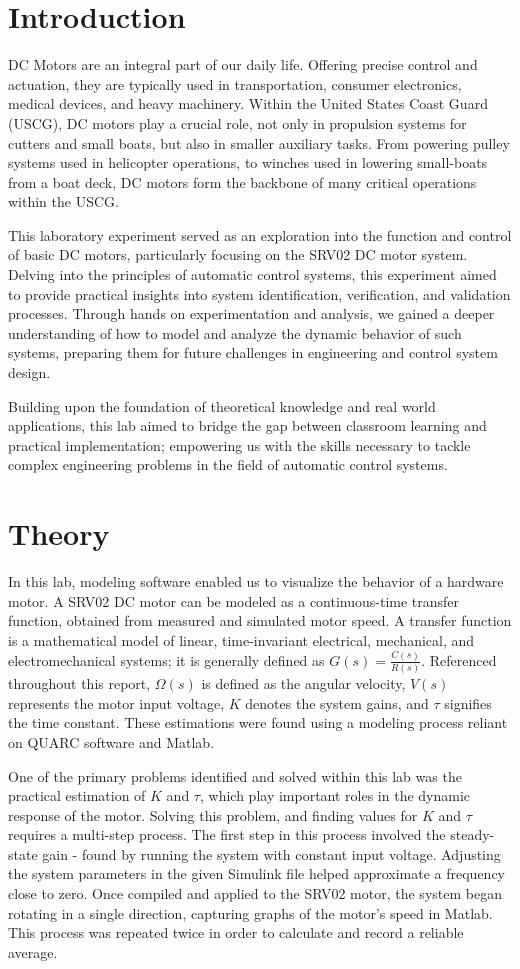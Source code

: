 \documentclass[conference,compsoc]{IEEEtran}
\begin{document}
  \section{Introduction}
  DC Motors are an integral part of our daily life. Offering precise control and actuation, they are typically used in transportation, consumer electronics, medical devices, and heavy machinery. Within the United States Coast Guard (USCG), DC motors play a crucial role, not only in propulsion systems for cutters and small boats, but also in smaller auxiliary tasks. From powering pulley systems used in helicopter operations, to winches used in lowering small-boats from a boat deck, DC motors form the backbone of many critical operations within the USCG.

  This laboratory experiment served as an exploration into the function and control of basic DC motors, particularly focusing on the SRV02 DC motor system. Delving into the principles of automatic control systems, this experiment aimed to provide practical insights into system identification, verification, and validation processes. Through hands on experimentation and analysis, we gained a deeper understanding of how to model and analyze the dynamic behavior of such systems, preparing them for future challenges in engineering and control system design.

  Building upon the foundation of theoretical knowledge and real world applications, this lab aimed to bridge the gap between classroom learning and practical implementation; empowering us with the skills necessary to tackle complex engineering problems in the field of automatic control systems.
  \section{Theory}
  In this lab, modeling software enabled us to visualize the behavior of a hardware motor. A SRV02 DC motor can be modeled as a continuous-time transfer function, obtained from measured and simulated motor speed. A transfer function is a mathematical model of linear, time-invariant electrical, mechanical, and electromechanical systems; it is generally defined as $G(s)=\frac{C(s)}{R(s)}$. Referenced throughout this report, $\Omega(s)$ is defined as the angular velocity, $V(s)$ represents the motor input voltage, $K$ denotes the system gains, and $\tau$ signifies the time constant. These estimations were found using a modeling process reliant on QUARC software and Matlab.

  One of the primary problems identified and solved within this lab was the practical estimation of $K$ and $\tau$, which play important roles in the dynamic response of the motor. Solving this problem, and finding values for $K$ and $\tau$ requires a multi-step process. The first step in this process involved the steady-state gain - found by running the system with constant input voltage. Adjusting the system parameters in the given Simulink file helped approximate a frequency close to zero. Once compiled and applied to the SRV02 motor, the system began rotating in a single direction, capturing graphs of the motor's speed in Matlab. This process was repeated twice in order to calculate and record a reliable average.
\end{document}
